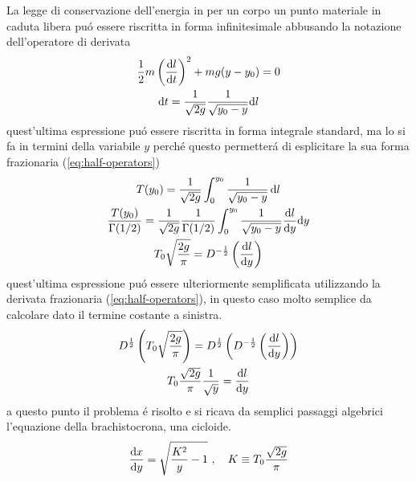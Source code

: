 \begin{multicols*}{3}
  La legge di conservazione dell'energia in per un corpo un punto materiale in caduta libera pu\'o essere
  riscritta in forma infinitesimale abbusando la notazione dell'operatore di derivata
  \begin{equation}
    \begin{gathered}
      \frac{1}{2}m\left(\dv{l}{t}\right)^2 + mg(y-y_0) = 0 \\
      \text{d}t = \frac{1}{\sqrt{2g}}\frac{1}{\sqrt{y_0 - y}}\text{d}l
    \end{gathered}
  \end{equation}
  quest'ultima espressione pu\'o essere riscritta in forma integrale standard, ma lo si fa in termini della
  variabile $y$ perch\'e questo permetter\'a di esplicitare la sua forma frazionaria (\ref{eq:half-operators})
  \begin{equation}
    \begin{gathered}
      T(y_0) = \frac{1}{\sqrt{2g}} \int_{0}^{y_0} \frac{1}{\sqrt{y_0 - y}}\dd{l} \\
      \frac{T(y_0)}{\Gamma(1/2)} = \frac{1}{\sqrt{2g}}\frac{1}{\Gamma(1/2)}\int_{0}^{y_0} \frac{1}{\sqrt{y_0 - y}} \dv{l}{y}\text{d}y \\
      T_0\sqrt{\frac{2g}{\pi}} = D^{-\frac{1}{2}}\left(\dv{l}{y}\right)
    \end{gathered}
  \end{equation}
  quest'ultima espressione pu\'o essere ulteriormente semplificata utilizzando la derivata frazionaria (\ref{eq:half-operators}),
  in questo caso molto semplice da calcolare dato il termine costante a sinistra.
  \begin{equation}
    \begin{gathered}
      D^{\frac{1}{2}}\left(T_0\sqrt{\frac{2g}{\pi}}\right) = D^{\frac{1}{2}}\left(D^{-\frac{1}{2}}\left(\dv{l}{y}\right)\right) \\
      T_0\frac{\sqrt{2g}}{\pi}\frac{1}{\sqrt{y}} = \dv{l}{y} \\
    \end{gathered}
  \end{equation}
  a questo punto il problema \'e risolto e si ricava da semplici passaggi algebrici l'equazione della brachistocrona, una cicloide.
  \begin{equation}
    \dv{x}{y} = \sqrt{\frac{K^2}{y} - 1} ~, \quad K \equiv T_0\frac{\sqrt{2g}}{\pi}
  \end{equation}

\end{multicols*}


